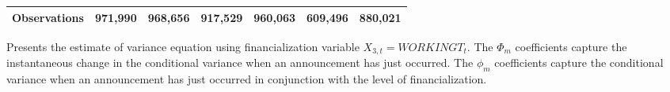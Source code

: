 \begin{landscape}
\begin{table}[]
{\begin{tabular}{lllllllllllll}
Observations &
  \multicolumn{2}{c}{971,990} &
  \multicolumn{2}{c}{968,656} &
  \multicolumn{2}{c}{917,529} &
  \multicolumn{2}{c}{960,063} &
  \multicolumn{2}{c}{609,496} &
  \multicolumn{2}{c}{880,021} \\ \hline
\end{tabular}%
}
 \singlespacing
        \footnotesize
    Presents the estimate of variance equation using financialization variable $X_{3,t}=WORKINGT_t$. The $\Phi_m$ coefficients capture the instantaneous change in the conditional variance when an announcement has just occurred. The $\phi_m$ coefficients capture the conditional variance when an announcement has just occurred in conjunction with the level of financialization.
\end{table}
\end{landscape}

